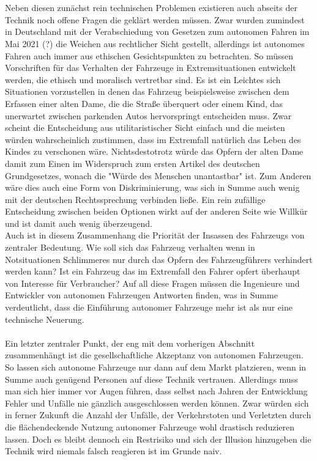 \documentclass[10pt,a4paper]{article}
\begin{document}
\\
\\
Neben diesen zunächst rein technischen Problemen existieren auch abseits der Technik noch offene Fragen die geklärt werden müssen. Zwar wurden zumindest in Deutschland mit der Verabschiedung von Gesetzen zum autonomen Fahren im Mai 2021 (?) die Weichen  aus rechtlicher Sicht gestellt, allerdings ist autonomes Fahren auch immer aus ethischen Gesichtspunkten zu betrachten. So müssen Vorschriften für das Verhalten der Fahrzeuge in Extremsituationen entwickelt werden, die ethisch und moralisch vertretbar sind. Es ist ein Leichtes sich Situationen vorzustellen in denen das Fahrzeug beispielsweise zwischen dem Erfassen einer alten Dame, die die Straße überquert oder einem Kind, das unerwartet zwischen parkenden Autos hervorspringt entscheiden muss. Zwar scheint die Entscheidung aus utilitaristischer Sicht einfach und die meisten würden wahrscheinlich zustimmen, dass im Extremfall natürlich das Leben des Kindes zu verschonen wäre. Nichtsdestotrotz würde das Opfern der alten Dame damit zum Einen im Widerspruch zum ersten Artikel des deutschen Grundgesetzes, wonach die "Würde des Menschen unantastbar" ist. Zum Anderen wäre dies auch eine Form von Diskriminierung, was sich in Summe auch wenig mit der deutschen Rechtssprechung verbinden ließe. Ein rein zufällige Entscheidung zwischen beiden Optionen wirkt auf der anderen Seite wie Willkür und ist damit auch wenig überzeugend. 
\\
Auch ist in diesem Zusammenhang die Priorität der Insassen des Fahrzeugs von zentraler Bedeutung. Wie soll sich das Fahrzeug verhalten wenn in Notsituationen Schlimmeres nur durch das Opfern des Fahrzeugführers verhindert werden kann? Ist ein Fahrzeug das im Extremfall den Fahrer opfert überhaupt von Interesse für Verbraucher? Auf all diese Fragen müssen die Ingenieure und Entwickler von autonomen Fahrzeugen Antworten finden, was in Summe verdeutlicht, dass die Einführung autonomer Fahrzeuge mehr ist als nur eine technische Neuerung.
\\
\\
Ein letzter zentraler Punkt, der eng mit dem vorherigen Abschnitt zusammenhängt ist die gesellschaftliche Akzeptanz von autonomen Fahrzeugen. So lassen sich autonome Fahrzeuge nur dann auf dem Markt platzieren, wenn in Summe auch genügend Personen auf diese Technik vertrauen. Allerdings muss man sich hier immer vor Augen führen, dass  selbst nach Jahren der Entwicklung Fehler und Unfälle nie gänzlich ausgeschlossen werden können. Zwar würden sich in ferner Zukunft die Anzahl der Unfälle, der Verkehrstoten und Verletzten durch die flächendeckende Nutzung autonomer Fahrzeuge wohl drastisch reduzieren lassen. Doch es bleibt dennoch ein Restrisiko und sich der Illusion hinzugeben die Technik wird niemals falsch reagieren ist im Grunde naiv.  
\end{document}
